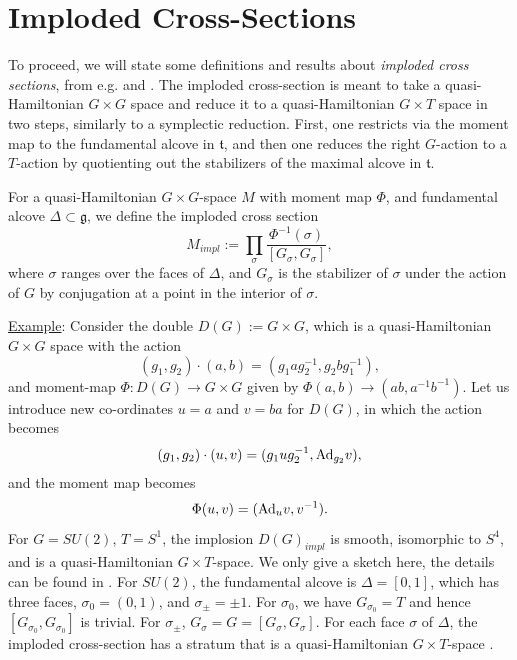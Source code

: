 	\section{Imploded Cross-Sections} 
	To proceed, we will state some definitions and results about \emph{imploded cross sections}, from e.g.\cite{alekseev_lie_1998} and \cite{jeffrey_imploded_2020}. The imploded cross-section is meant to take a quasi-Hamiltonian $G\times G$ space and reduce it to a quasi-Hamiltonian $G\times T$ space in two steps, similarly to a symplectic reduction. First, one restricts via the moment map to the fundamental alcove in $\mathfrak{t}$, and then one reduces the right $G$-action to a $T$-action by quotienting out the stabilizers of the maximal alcove in $\mathfrak{t}$.
	\begin{definition}
		For a quasi-Hamiltonian $G\times G$-space $M$ with moment map $\Phi$, and fundamental alcove $\Delta\subset \mathfrak{g}$, we define the imploded cross section 
		\begin{equation}
			M_{impl} := \prod_{\sigma} \frac{\Phi^{-1}(\sigma)}{[G_\sigma, G_\sigma]},
		\end{equation}
		where $\sigma$ ranges over the faces of $\Delta$, and $G_\sigma$ is the stabilizer of $\sigma$ under the action of $G$ by conjugation at a point in the interior of $\sigma$.
	\end{definition}
	\underline{Example}: Consider the double $D(G):=G\times G$, which is a quasi-Hamiltonian $G\times G$ space with the action
	\begin{equation}
		(g_1,g_2)\cdot (a,b) = (g_1 a g_2^{-1}, g_2bg_1^{-1}),
	\end{equation}
	and moment-map $\Phi:D(G)\to G\times G$ given by $\Phi(a,b)\to(ab,a^{-1}b^{-1})$. Let us introduce new co-ordinates $u=a$ and $v=ba$ for $D(G)$, in which the action becomes
	\begin{equation}
		(g_1,g_2)\cdot(u,v) = (g_1ug_2^{-1}, \text{Ad}_{g_2} v),
	\end{equation}
	and the moment map becomes
	\begin{equation}
		\Phi(u,v) = (\text{Ad}_u v, v^{-1}).
	\end{equation}
	For $G=SU(2)$, $T=S^1$, the implosion $D(G)_{impl}$ is smooth, isomorphic to $S^4$, and is a quasi-Hamiltonian $G\times T$-space. We only give a sketch here, the details can be found in \cite[Prop 2.29]{hurtubise_representations_2000}. For $SU(2)$, the fundamental alcove is $\Delta = [0,1]$, which has three faces, $\sigma_0 = (0,1)$, and $\sigma_{\pm} = \pm1$. For $\sigma_0$, we have $G_{\sigma_0} = T$ and hence $[G_{\sigma_0}, G_{\sigma_0}]$ is trivial. For $\sigma_\pm$, $G_\sigma = G = [G_\sigma,G_\sigma]$. For each face $\sigma$ of $\Delta$, the imploded cross-section has a stratum that is a quasi-Hamiltonian $G\times T$-space \cite[Theorem 5.1]{alekseev_lie_1998}.
		
